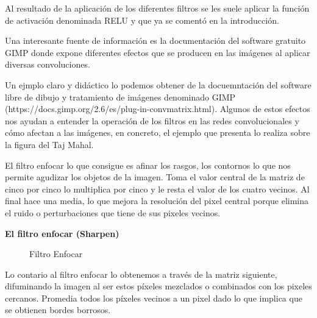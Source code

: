 \documentclass[
  a4paper,
  DIV=11,
  numbers=noendperiod]{scrreprt}
\begin{document}
Al resultado de la aplicación de los diferentes filtros se les suele
aplicar la función de activación denominada RELU y que ya se comentó en
la introducción.

Una interesante fuente de información es la documentación del software
gratuito GIMP donde expone diferentes efectos que se producen en las
imágenes al aplicar diversas convoluciones.

Un ejmplo claro y didáctico lo podemos obtener de la docuemntación del
software libre de dibujo y tratamiento de imágenes denominado GIMP
(https://docs.gimp.org/2.6/es/plug-in-convmatrix.html). Algunos de estos
efectos nos ayudan a entender la operación de los filtros en las redes
convolucionales y cómo afectan a las imágenes, en concreto, el ejemplo
que presenta lo realiza sobre la figura del Taj Mahal.

El filtro enfocar lo que consigue es afinar los rasgos, los contornos lo
que nos permite agudizar los objetos de la imagen. Toma el valor central
de la matriz de cinco por cinco lo multiplica por cinco y le resta el
valor de los cuatro vecinos. Al final hace una media, lo que mejora la
resolución del pixel central porque elimina el ruido o perturbaciones
que tiene de sus pixeles vecinos.

\textbf{El filtro enfocar (Sharpen)}

\begin{figure}


\caption{\label{fig-filtro_enfocar}Filtro Enfocar}

\end{figure}%

Lo contario al filtro enfocar lo obtenemos a través de la matriz
siguiente, difuminando la imagen al ser estos píxeles mezclados o
combinados con los pixeles cercanos. Promedia todos los píxeles vecinos
a un pixel dado lo que implica que se obtienen bordes borrosos.
\end{document}
